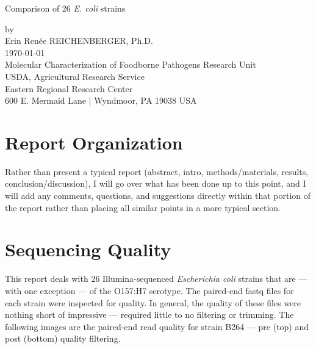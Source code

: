\documentclass[11pt]{article}
\begin{document}
\begin{center}
\vspace{5.75cm}
\Huge{Comparison of 26 \textit{E. coli} strains}\\
\vspace{6.75cm}

\normalsize{by} \\
\vspace{.75cm}
\normalsize{Erin Ren\'{e}e REICHENBERGER, Ph.D.} \\
\vspace{4.75cm}
\large{\normalsize{\today}} \\

\vspace{2.75cm}
\normalsize{Molecular Characterization of Foodborne Pathogens Research Unit}\\   %
\normalsize{USDA, Agricultural Research Service} \\
\normalsize{Eastern Regional Research Center} \\
\normalsize{600 E. Mermaid Lane | Wyndmoor, PA 19038 USA}
\end{center}
\clearpage

\section*{Report Organization}
Rather than present a typical report (abstract, intro, methods/materials, results, conclusion/discussion), I will go over what has been done up to this point, and I will add any comments, questions, and suggestions directly within that portion of the report rather than placing all similar points in a more typical section.\\

\section*{Sequencing Quality}
This report deals with 26 Illumina-sequenced \textit{Escherichia coli} strains that are --- with one exception --- of the O157:H7 serotype. The paired-end fastq files for each strain were inspected for quality. In general, the quality of these files were nothing short of impressive --- required little to no filtering or trimming. The following images are the paired-end read quality for strain B264 --- pre (top) and post (bottom) quality filtering.
\end{document}
